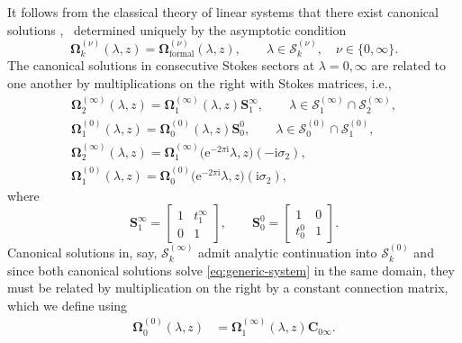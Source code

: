 \documentclass[pdftex]{sigma}
\numberwithin{equation}{section}
\newcommand{\ee}{\mathrm{e}}
\newcommand{\ii}{\mathrm{i}}
\begin{document}
It follows from the classical theory of linear systems that there exist canonical solutions ,~ determined uniquely by the asymptotic condition
\begin{equation}
\mathbf{\Omega}_k^{(\nu)}(\lambda, z) = \mathbf{\Omega}^{(\nu)}_{\text{formal}}(\lambda, z), \qquad \lambda \in \mathcal S_k^{(\nu)}, \quad \nu \in \{0, \infty\}.
\label{eq:psi-asymptotic-condition-D8}
\end{equation}
The canonical solutions in consecutive Stokes sectors at $\lambda=0,\infty$ are related to one another by multiplications on the right with Stokes matrices, i.e.,
\begin{gather}%
\label{eq:stokes-condition-D8-1}\mathbf{\Omega}_2^{(\infty)}(\lambda, z) = \mathbf{\Omega}_1^{(\infty)}(\lambda,z) \mathbf{S}^{\infty}_{1},\qquad \lambda\in \mathcal S_1^{(\infty)}\cap \mathcal S_2^{(\infty)},\\
\mathbf{\Omega}_1^{(0)}(\lambda, z) = \mathbf{\Omega}_0^{(0)}(\lambda, z) \mathbf{S}^{0}_{0}, \qquad \lambda\in \mathcal S_0^{(0)}\cap \mathcal S_1^{(0)}, \\
\mathbf{\Omega}_{2}^{(\infty)}(\lambda, z) = \mathbf{\Omega}_1^{(\infty)}\big(\ee^{-2\pi \ii} \lambda, z\big) (-\ii\sigma_2), \\
\label{eq:stokes-condition-D8-4}\mathbf{\Omega}_{1}^{(0)}(\lambda, z) = \mathbf{\Omega}_0^{(0)}\big(\ee^{-2\pi \ii} \lambda, z\big) (\ii\sigma_2),
\end{gather}
where
\begin{equation}
\mathbf{S}^\infty_{1}= \begin{bmatrix}1&t^\infty_1\\0&1\end{bmatrix},\qquad \mathbf{S}^0_{{0}}=
 \begin{bmatrix}1&0\\{t^0_0}&1\end{bmatrix} .
 \label{eq:Stokes-zero}
\end{equation}
Canonical solutions in, say, $\mathcal S_k^{(\infty)}$ admit analytic continuation into $\mathcal S_k^{(0)}$ and since both canonical solutions solve \eqref{eq:generic-system} in the same domain, they must be related by multiplication on the right by a constant connection matrix, which we define using
\begin{align}
\mathbf{\Omega}_0^{(0)}(\lambda, z) &= \mathbf{\Omega}_1^{(\infty)}(\lambda, z) \mathbf{C}_{0\infty}.
\label{eq:connection-matrix-D8}
\end{align}
\end{document}
